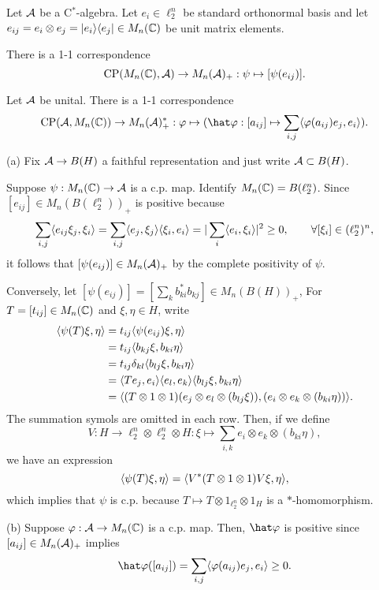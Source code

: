 \documentclass{../../small}
\begin{document}
\begin{thm}
Let $\mathcal{A}$ be a C$^*$-algebra.
Let $e_i\in\ell_2^n$ be standard orthonormal basis and let $e_{ij}=e_i\otimes e_j=|e_i\rangle\langle e_j|\in M_n(\mathbb{C})$ be unit matrix elements.
\begin{parts}
\item
There is a 1-1 correspondence
\[\mathrm{CP}(M_n(\mathbb{C}),\mathcal{A})\to M_n(\mathcal{A})_+:\psi\mapsto[\psi(e_{ij})].\]
\item
Let $\mathcal{A}$ be unital.
There is a 1-1 correspondence
\[\mathrm{CP}(\cA,M_n(\C))\to M_n(\cA)^*_+:\f\mapsto(\hat\f:[a_{ij}]\mapsto\sum_{i,j}\<\f(a_{ij})e_j,e_i\>).\]
\end{parts}
\end{thm}
\begin{pf}
(a)
Fix $\mathcal{A}\to B(H)$ a faithful representation and just write $\mathcal{A}\subset B(H)$.

Suppose $\psi:M_n(\mathbb{C})\to\mathcal{A}$ is a c.p. map.
Identify $M_n(\mathbb{C})=B(\ell_2^n)$.
Since $[e_{ij}]\in M_n(B(\ell_2^n))_+$ is positive because
\[\sum_{i,j}\langle e_{ij}\xi_j,\xi_i\rangle=\sum_{i,j}\langle e_j,\xi_j\rangle\langle\xi_i,e_i\rangle=|\sum_i\langle e_i,\xi_i\rangle|^2\ge0,\qquad\forall[\xi_i]\in(\ell_2^n)^n,\]
it follows that $[\psi(e_{ij})]\in M_n(\mathcal{A})_+$ by the complete positivity of $\psi$.

Conversely, let $[\psi(e_{ij})]=[\sum_kb_{ki}^*b_{kj}]\in M_n(B(H))_+$,
For $T=[t_{ij}]\in M_n(\mathbb{C})$ and $\xi,\eta\in H$, write
\begin{align*}
\langle\psi(T)\xi,\eta\rangle
&=t_{ij}\langle\psi(e_{ij})\xi,\eta\rangle\\
&=t_{ij}\langle b_{kj}\xi,b_{ki}\eta\rangle\\
&=t_{ij}\delta_{kl}\langle b_{lj}\xi,b_{ki}\eta\rangle\\
&=\langle Te_j,e_i\rangle\langle e_l,e_k\rangle\langle b_{lj}\xi,b_{ki}\eta\rangle\\
&=\langle(T\otimes1\otimes1)(e_j\otimes e_l\otimes(b_{lj}\xi)),(e_i\otimes e_k\otimes(b_{ki}\eta))\rangle.
\end{align*}
The summation symols are omitted in each row.
Then, if we define
\[V:H\to\ell_2^n\otimes\ell_2^n\otimes H:\xi\mapsto\sum_{i,k}e_i\otimes e_k\otimes(b_{ki}\eta),\]
we have an expression
\[\langle\psi(T)\xi,\eta\rangle=\langle V^*(T\otimes1\otimes1)V\xi,\eta\rangle,\]
which implies that $\psi$ is c.p. because $T\mapsto T\otimes1_{\ell_2^n}\otimes1_H$ is a $*$-homomorphism.

(b)
Suppose $\varphi:\mathcal{A}\to M_n(\mathbb{C})$ is a c.p. map.
Then, $\hat\f$ is positive since $[a_{ij}]\in M_n(\mathcal{A})_+$ implies
\[\hat\f([a_{ij}])=\sum_{i,j}\<\f(a_{ij})e_j,e_i\>\ge0.\]


\end{pf}
\end{document}
